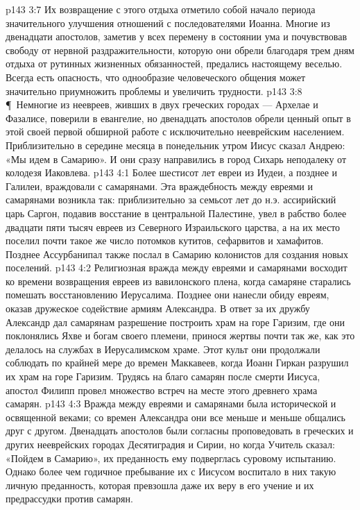 \vs p143 3:7 Их возвращение с этого отдыха отметило собой начало периода значительного улучшения отношений с последователями Иоанна. Многие из двенадцати апостолов, заметив у всех перемену в состоянии ума и почувствовав свободу от нервной раздражительности, которую они обрели благодаря трем дням отдыха от рутинных жизненных обязанностей, предались настоящему веселью. Всегда есть опасность, что однообразие человеческого общения может значительно приумножить проблемы и увеличить трудности.
\vs p143 3:8 \P\ Немногие из неевреев, живших в двух греческих городах --- Архелае и Фазалисе, поверили в евангелие, но двенадцать апостолов обрели ценный опыт в этой своей первой обширной работе с исключительно нееврейским населением. Приблизительно в середине месяца в понедельник утром Иисус сказал Андрею: «Мы идем в Самарию». И они сразу направились в город Сихарь неподалеку от колодезя Иаковлева.
\vs p143 4:1 Более шестисот лет евреи из Иудеи, а позднее и Галилеи, враждовали с самарянами. Эта враждебность между евреями и самарянами возникла так: приблизительно за семьсот лет до н.э. ассирийский царь Саргон, подавив восстание в центральной Палестине, увел в рабство более двадцати пяти тысяч евреев из Северного Израильского царства, а на их место поселил почти такое же число потомков кутитов, сефарвитов и хамафитов. Позднее Ассурбанипал также послал в Самарию колонистов для создания новых поселений.
\vs p143 4:2 Религиозная вражда между евреями и самарянами восходит ко времени возвращения евреев из вавилонского плена, когда самаряне старались помешать восстановлению Иерусалима. Позднее они нанесли обиду евреям, оказав дружеское содействие армиям Александра. В ответ за их дружбу Александр дал самарянам разрешение построить храм на горе Гаризим, где они поклонялись Яхве и богам своего племени, принося жертвы почти так же, как это делалось на службах в Иерусалимском храме. Этот культ они продолжали соблюдать по крайней мере до времен Маккавеев, когда Иоанн Гиркан разрушил их храм на горе Гаризим. Трудясь на благо самарян после смерти Иисуса, апостол Филипп провел множество встреч на месте этого древнего храма самарян.
\vs p143 4:3 Вражда между евреями и самарянами была исторической и освященной веками; со времен Александра они все меньше и меньше общались друг с другом. Двенадцать апостолов были согласны проповедовать в греческих и других нееврейских городах Десятиградия и Сирии, но когда Учитель сказал: «Пойдем в Самарию», их преданность ему подверглась суровому испытанию. Однако более чем годичное пребывание их с Иисусом воспитало в них такую личную преданность, которая превзошла даже их веру в его учение и их предрассудки против самарян.
